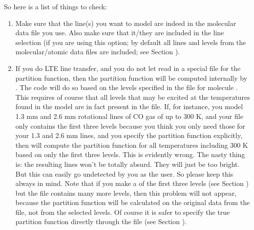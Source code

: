 \documentclass[letterpaper,10pt,english]{sphinxmanual}
\begin{document}
So here is a list of things to check:
\begin{enumerate}
%
\item {} 
Make sure that the line(s) you want to model are indeed in the
molecular data file you use. Also make sure that it/they are included in
the line selection (if you are using this option; by default all lines and
levels from the molecular/atomic data files are included; see Section
{\hyperref[\detokenize{lineradtrans:sec-calcstore-levpop}]{}}).

\item {} 
If you do LTE line transfer, and you do not let 
read in a special file for the partition function, then the partition
function will be computed internally by . The code will
do so based on the levels specified in the 
file for molecule . This requires of course that all levels
that may be excited at the temperatures found in the model are in fact
present in the  file. If, for instance, you
model 1.3 mm and 2.6 mm rotational lines of CO gas of up to 300 K, and
your file  only contains the first three
levels because you think you only need those for your 1.3 and 2.6 mm
lines, and you  specify the partition function explicitly, then
 will compute the partition function for all
temperatures including 300 K based on only the first three levels. This is
evidently wrong. The nasty thing is: the resulting lines won’t be totally
absurd. They will just be too bright. But this can easily go undetected by
you as the user. So please keep this always in mind.  Note that if you
make a  of the first three levels (see Section
{\hyperref[\detokenize{lineradtrans:sec-line-selection}]{}}) but the file 
contains many more levels, then this problem will not appear, because the
partition function will be calculated on the original data from the
 file, not from the selected levels.  Of
course it is safer to specify the true partition function directly through
the file  (see Section
{\hyperref[\detokenize{lineradtrans:sec-partition-function}]{}}).


\end{enumerate}
\end{document}
